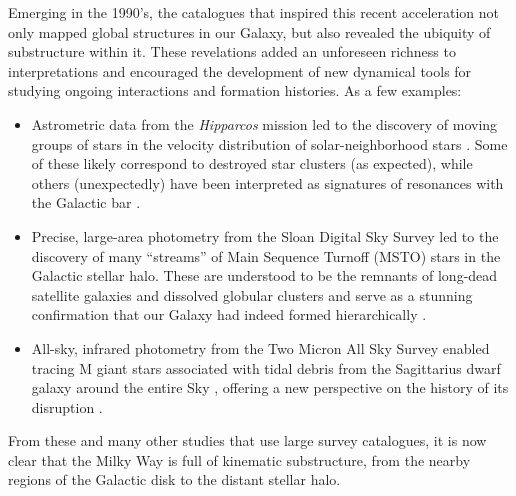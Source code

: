\documentclass[galaxies,article,submit,moreauthors,pdftex,10pt,a4paper]{mdpi}
\newcommand{\survey}[1]{\textsl{#1}}
\begin{document}
Emerging in the 1990's, the catalogues that inspired this recent acceleration not only mapped global structures in our Galaxy, but also revealed the ubiquity of substructure within it.
These revelations added an unforeseen richness to interpretations and encouraged the development of new dynamical tools for studying ongoing interactions and formation histories.
As a few examples:
\begin{itemize}
    \item Astrometric data from the \survey{Hipparcos} mission \cite{esa97} led
        to the discovery of moving groups of stars in the velocity distribution
        of solar-neighborhood stars \cite{dehnen98}. Some of these likely
        correspond to destroyed star clusters (as expected), while others
        (unexpectedly) have been interpreted as signatures of resonances with
        the Galactic bar \cite{dehnen00}.
    \item Precise, large-area photometry from the Sloan Digital Sky Survey
        \cite[hereafter, SDSS ---][]{york00,stoughton02,abazajian03} led to the
        discovery of many ``streams'' of Main Sequence Turnoff (MSTO) stars in
        the Galactic stellar halo. These are understood to be the remnants of
        long-dead satellite galaxies and dissolved globular clusters
        \cite{newberg02,belokurov06} and serve as a stunning confirmation that
        our Galaxy had indeed formed hierarchically
        \cite[e.g.,][]{bullock01,bullock05}.
    \item All-sky, infrared photometry from the Two Micron All Sky Survey
        \cite[hereafter, 2MASS ---][]{nikolaev00} enabled tracing M giant stars
        associated with tidal debris from the Sagittarius dwarf galaxy around
        the entire Sky \cite{majewski03}, offering a new perspective on the
        history of its disruption \cite{law10}.
\end{itemize}
From these and many other studies that use large survey catalogues, it is now clear that the Milky Way is full of kinematic substructure, from the nearby regions of the Galactic disk to the distant stellar halo.
\end{document}
